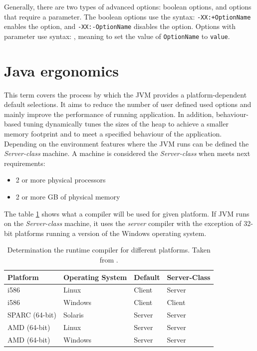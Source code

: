 \documentclass[
  digital, %
  oneside,
  notable, %
  nolof,     %
  nolot     %
]{fithesis3}
\begin{document}
Generally, there are two types of advanced options: boolean options, and options that require a parameter. The boolean options use the syntax: \texttt{-XX:+OptionName} enables the option, and \texttt{-XX:-OptionName} disables the option. Options with parameter use syntax: \texttt{}, meaning to set the value of \texttt{OptionName} to \texttt{value}. \cite{scott}



\section{Java ergonomics}\label{secerg}
This term covers the process by which the JVM provides a platform-dependent default selections. It aims to reduce the number of user defined used options and mainly improve the performance of running application. In addition, behaviour-based tuning dynamically tunes the sizes of the heap to achieve a smaller memory footprint and to meet a specified behaviour of the application. Depending on the environment features where the JVM runs can be defined the \textit{Server-class} machine. A machine is considered the \textit{Server-class} when meets next requirements:
\begin{itemize}
	\item 2 or more physical processors
	\item 2 or more GB of physical memory
\end{itemize}
The table \ref{figerg} shows what a compiler will be used for given platform. If JVM runs on the \textit{Server-class} machine, it uses the \textit{server} compiler with the exception of 32-bit platforms running a version of the Windows operating system.

\begin{table}[]
	\centering
	\begin{tabular}{|l|l|l|l|}
		\hline
		\textbf{Platform} & \textbf{Operating System} & \textbf{Default} & \textbf{Server-Class} \\ \hline
		i586              & Linux                     & Client           & Server                           \\ \hline
		i586              & Windows                   & Client           & Client                           \\ \hline
		SPARC (64-bit)    & Solaris                   & Server           & Server                           \\ \hline
		AMD (64-bit)      & Linux                     & Server           & Server                           \\ \hline
		AMD (64-bit)      & Windows                   & Server           & Server                           \\ \hline
	\end{tabular}
	\caption{Determination the runtime compiler for different platforms. Taken from \cite{ergonomics}.}
	\label{figerg}
\end{table}
\end{document}
